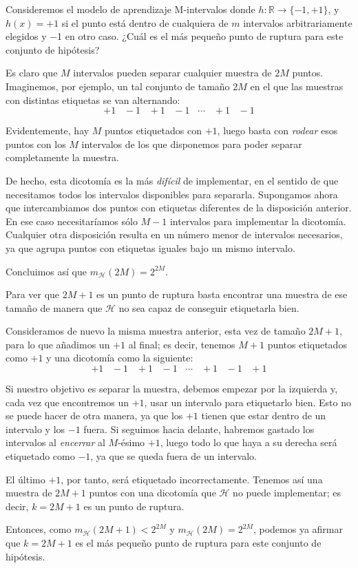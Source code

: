\documentclass[a4paper, 11pt]{article}
\begin{document}
    \begin{ejercicio}
        Consideremos el modelo de aprendizaje \guillemotleft M-intervalos \guillemotright donde $h \colon \mathbb{R} \to \{−1, +1\}$, y $h(x) = +1$ si el punto está dentro de cualquiera de $m$ intervalos arbitrariamente elegidos y −1 en otro caso. ¿Cuál es el más pequeño punto de ruptura para este conjunto de hipótesis?
    \end{ejercicio}

    \begin{solucion}
        Es claro que $M$ intervalos pueden separar cualquier muestra de $2M$ puntos. Imaginemos, por ejemplo, un tal conjunto de tamaño $2M$ en el que las muestras con distintas etiquetas se van alternando:
        \[
        +1 \;\;\; -1  \;\;\; +1  \;\;\; -1  \;\;\; \cdots  \;\;\; +1  \;\;\; -1
        \]

        Evidentemente, hay $M$ puntos etiquetados con $+1$, luego basta con \emph{rodear} esos puntos con los $M$ intervalos de los que disponemos para poder separar completamente la muestra.

        De hecho, esta dicotomía es la más \emph{difícil} de implementar, en el sentido de que necesitamos todos los intervalos disponibles para separarla. Supongamos ahora que intercambiamos dos puntos con etiquetas diferentes de la disposición anterior. En ese caso necesitaríamos sólo $M - 1$ intervalos para implementar la dicotomía. Cualquier otra disposición resulta en un número menor de intervalos necesarios, ya que agrupa puntos con etiquetas iguales bajo un mismo intervalo.

        Concluimos así que $m_{\mathcal{H}}(2M) = 2^{2M}$.

        Para ver que $2M + 1$ es un punto de ruptura basta encontrar una muestra de ese tamaño de manera que $\mathcal{H}$ no sea capaz de conseguir etiquetarla bien.

        Consideramos de nuevo la misma muestra anterior, esta vez de tamaño $2M + 1$, para lo que añadimos un $+1$ al final; es decir, tenemos $M + 1$ puntos etiquetados como $+1$ y una dicotomía como la siguiente:
        \[
        +1 \;\;\; -1  \;\;\; +1  \;\;\; -1  \;\;\; \cdots  \;\;\; +1  \;\;\; -1  \;\;\; +1
        \]

        Si nuestro objetivo es separar la muestra, debemos empezar por la izquierda y, cada vez que encontremos un $+1$, usar un intervalo para etiquetarlo bien. Esto no se puede hacer de otra manera, ya que los $+1$ tienen que estar dentro de un intervalo y los $-1$ fuera. Si seguimos hacia delante, habremos gastado los intervalos al \emph{encerrar} al $M$-ésimo $+1$, luego todo lo que haya a su derecha será etiquetado como $-1$, ya que se queda fuera de un intervalo.

        El último $+1$, por tanto, será etiquetado incorrectamente. Tenemos así una muestra de $2M + 1$ puntos con una dicotomía que $\mathcal{H}$ no puede implementar; es decir, $k = 2M + 1$ es un punto de ruptura.

        Entonces, como $m_{\mathcal{H}}(2M + 1) < 2^{2M}$ y $m_{\mathcal{H}}(2M) = 2^{2M}$, podemos ya afirmar que $k = 2M + 1$ es el más pequeño punto de ruptura para este conjunto de hipótesis.
    \end{solucion}
\end{document}
